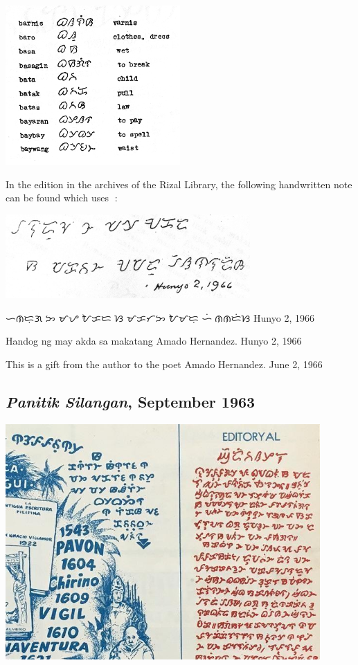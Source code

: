 \documentclass[a4paper,pagesize,openany,14pt,parskip=never]{scrbook}
\newcommand{\≈}{$\approx$}
\begin{document}
\includegraphics[width=0.5\textwidth]{Dict}

In the edition in the archives of the Rizal Library, the following handwritten note can be found which uses {\baybayinh ᜍ}:

\includegraphics[width=0.7\textwidth]{HandwritingZ}

{\baybayinh ᜑᜈᜇᜓᜄ ᜅ ᜋᜌ ᜀᜃᜇ ᜐ ᜋᜃᜆᜅ ᜀᜋᜇᜓ ᜑᜒᜍᜈᜈᜇᜒᜐ} Hunyo 2, 1966

Handog ng may akda sa makatang Amado Hernandez. Hunyo 2, 1966

This is a gift from the author to the poet Amado Hernandez. June 2, 1966

\subsection{{\em Panitik Silangan}, September 1963}
\includegraphics[width=0.9\textwidth]{PS}
\end{document}
